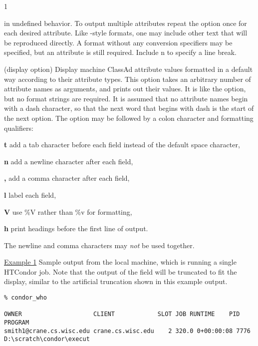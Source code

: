 \begin{ManPage}{\label{man-condor-who}}{1}
\begin{Options}
{      in undefined behavior.  To output multiple attributes
      repeat the  option once for each desired
      attribute.
      Like -style formats, one may include other
      text that will be reproduced directly.
      A format without any conversion specifiers may be specified,
      but an attribute is still required.
      Include \Bs n to specify a line break. }
     {
      (display option) Display machine ClassAd attribute values 
      formatted in a default way according to their attribute types.  
      This option takes an arbitrary number of attribute names as arguments,
      and prints out their values.  It is like the  option,
      but no format strings are required.
      It is assumed that no attribute names begin with a dash character,
      so that the next word that begins with dash is the 
      start of the next option.
      The  option may be followed by a colon character
      and formatting qualifiers:

      \textbf{t} add a tab character before each field instead of 
      the default space character,

      \textbf{n} add a newline character after each field,

      \textbf{,} add a comma character after each field,

      \textbf{l} label each field,

      \textbf{V} use \%V rather than \%v for formatting,

      \textbf{h} print headings before the first line of output.

      The newline and comma characters may \emph{not} be used together.
      }
\end{Options}

\Examples

\underline{Example 1} Sample output from the local machine,
which is running a single HTCondor job.
Note that the output of the  field will be truncated
to fit the display, similar to the artificial truncation shown in this 
example output.
\footnotesize
\begin{verbatim}
% condor_who 

OWNER                    CLIENT            SLOT JOB RUNTIME    PID    PROGRAM
smith1@crane.cs.wisc.edu crane.cs.wisc.edu    2 320.0 0+00:00:08 7776 D:\scratch\condor\execut
\end{verbatim}
\normalsize


\end{ManPage}
